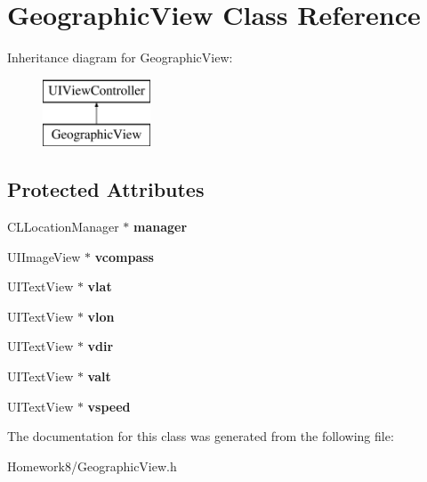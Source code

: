 \hypertarget{interface_geographic_view}{}\section{Geographic\+View Class Reference}
\label{interface_geographic_view}
Inheritance diagram for Geographic\+View\+:\begin{figure}[H]
\begin{center}
\leavevmode
\includegraphics[height=2.000000cm]{interface_geographic_view}
\end{center}
\end{figure}
\subsection*{Protected Attributes}
\begin{DoxyCompactItemize}
\item 
\mbox{\label{interface_geographic_view_ac59ae9d08065e3932794fd3465dd5711}} 
C\+L\+Location\+Manager $\ast$ {\bfseries manager}
\item 
\mbox{\label{interface_geographic_view_a1d15140f77e7b613af0dbc818777b5b7}} 
U\+I\+Image\+View $\ast$ {\bfseries vcompass}
\item 
\mbox{\label{interface_geographic_view_ac4c2ade1c371a5b77d532317331ce072}} 
U\+I\+Text\+View $\ast$ {\bfseries vlat}
\item 
\mbox{\label{interface_geographic_view_a09fbfe2e1d8b1826626c73725e01a238}} 
U\+I\+Text\+View $\ast$ {\bfseries vlon}
\item 
\mbox{\label{interface_geographic_view_a6c91f0a9699be7ba59bf7690027e20e9}} 
U\+I\+Text\+View $\ast$ {\bfseries vdir}
\item 
\mbox{\label{interface_geographic_view_ac0e4fd8402f5ca0aac7f7a8d55cbb635}} 
U\+I\+Text\+View $\ast$ {\bfseries valt}
\item 
\mbox{\label{interface_geographic_view_af88e600b7637adc61d79f24dfa4e9d00}} 
U\+I\+Text\+View $\ast$ {\bfseries vspeed}
\end{DoxyCompactItemize}


The documentation for this class was generated from the following file\+:\begin{DoxyCompactItemize}
\item 
Homework8/Geographic\+View.\+h\end{DoxyCompactItemize}
